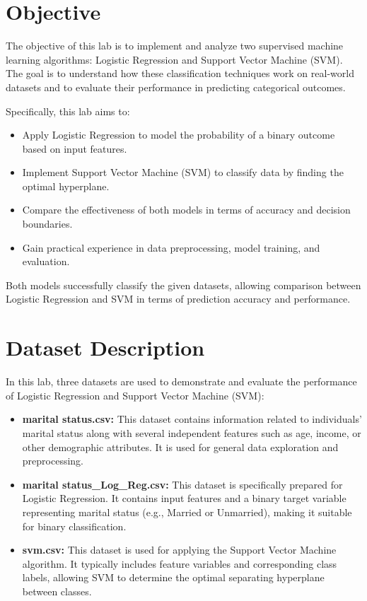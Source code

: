 \documentclass[11pt]{article}
\begin{document}
    
\tableofcontents
\thispagestyle{empty}
\clearpage
{}
    
    
\section{Objective}
The objective of this lab is to implement and analyze two supervised machine learning algorithms: Logistic Regression and Support Vector Machine (SVM). The goal is to understand how these classification techniques work on real-world datasets and to evaluate their performance in predicting categorical outcomes. 

Specifically, this lab aims to:
\begin{itemize}
    \item Apply Logistic Regression to model the probability of a binary outcome based on input features.
    \item Implement Support Vector Machine (SVM) to classify data by finding the optimal hyperplane.
    \item Compare the effectiveness of both models in terms of accuracy and decision boundaries.
    \item Gain practical experience in data preprocessing, model training, and evaluation.
\end{itemize}


Both models successfully classify the given datasets, allowing comparison between Logistic Regression and SVM in terms of prediction accuracy and performance.


\section{Dataset Description}

In this lab, three datasets are used to demonstrate and evaluate the performance of Logistic Regression and Support Vector Machine (SVM):

\begin{itemize}
    \item \textbf{marital status.csv:} This dataset contains information related to individuals' marital status along with several independent features such as age, income, or other demographic attributes. It is used for general data exploration and preprocessing.

    \item \textbf{marital status\_Log\_Reg.csv:} This dataset is specifically prepared for Logistic Regression. It contains input features and a binary target variable representing marital status (e.g., Married or Unmarried), making it suitable for binary classification.

    \item \textbf{svm.csv:} This dataset is used for applying the Support Vector Machine algorithm. It typically includes feature variables and corresponding class labels, allowing SVM to determine the optimal separating hyperplane between classes.
\end{itemize}
\end{document}
